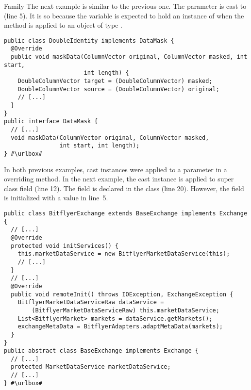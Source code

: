 \begin{pattern}{Family}
The next example is similar to the previous one.
The  parameter is cast to  (line 5).
It is so because the  variable is expected to hold an instance of  when the  method is applied to an object of type .
\def\urlvar{http://bit.ly/apache_orc_2SE4C2m}
\begin{verbatim}
public class DoubleIdentity implements DataMask {
  @Override
  public void maskData(ColumnVector original, ColumnVector masked, int start,
                       int length) {
    DoubleColumnVector target = (DoubleColumnVector) masked;
    DoubleColumnVector source = (DoubleColumnVector) original;
    // [...]
  }
}
public interface DataMask {
  // [...]
  void maskData(ColumnVector original, ColumnVector masked,
                int start, int length);
} #\urlbox#
\end{verbatim}

In both previous examples,
cast instances were applied to a parameter in a overriding method.
In the next example, the cast instance is applied to super class field (line 12).
The field is declared in the  class (line 20).
However, the field is initialized with a  value in line~5.

\def\urlvar{http://bit.ly/knowm_XChange_2UPPDj9}
\begin{verbatim}
public class BitflyerExchange extends BaseExchange implements Exchange {
  // [...]
  @Override
  protected void initServices() {
    this.marketDataService = new BitflyerMarketDataService(this);
    // [...]
  }
  // [...]
  @Override
  public void remoteInit() throws IOException, ExchangeException {
    BitflyerMarketDataServiceRaw dataService =
        (BitflyerMarketDataServiceRaw) this.marketDataService;
    List<BitflyerMarket> markets = dataService.getMarkets();
    exchangeMetaData = BitflyerAdapters.adaptMetaData(markets);
  }
}
public abstract class BaseExchange implements Exchange {
  // [...]
  protected MarketDataService marketDataService;
  // [...]
} #\urlbox#
\end{verbatim}


\end{pattern}
